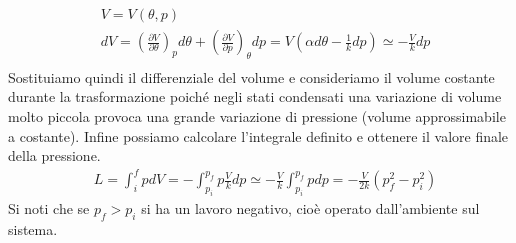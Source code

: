 \documentclass[10pt,a4paper]{article}
\begin{document}
\begin{enumerate}
	\begin{align*} 
		&V = V(\theta, p)\\
		&dV = \left(\frac{\partial V}{\partial \theta}\right)_p d\theta + \left(\frac{\partial V}{\partial p}\right)_{\theta} dp = V(\alpha d\theta-\frac{1}{k} dp)\simeq-\frac{V}{k}dp\\
	\end{align*}  
Sostituiamo quindi il differenziale del volume e consideriamo il volume costante durante la trasformazione poiché negli stati condensati una variazione di volume molto piccola provoca una grande variazione di pressione (volume approssimabile a costante). Infine possiamo calcolare l'integrale definito e ottenere il valore finale della pressione. 
\begin{align*} 
	&L=\int_{i}^{f}pdV = -\int_{p_i}^{p_f}p\frac{V}{k}dp \simeq -\frac{V}{k}\int_{p_i}^{p_f}pdp = -\frac{V}{2k}\left(p_f^2-p_i^2\right)
\end{align*} 
Si noti che se $p_f > p_i$ si ha un lavoro negativo, cioè operato dall'ambiente sul sistema. 
\end{enumerate}
\end{document}
